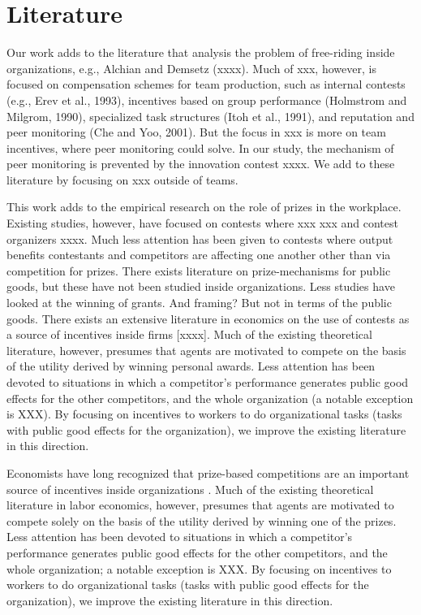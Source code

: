 \documentclass[11pt, titlepage]{article}
\begin{document}
\section{Literature}\label{literature}

Our work adds to the literature that analysis the problem of free-riding
inside organizations, e.g., Alchian and Demsetz (xxxx). Much of xxx,
however, is focused on compensation schemes for team production, such as
internal contests (e.g., Erev et al., 1993), incentives based on group
performance (Holmstrom and Milgrom, 1990), specialized task structures
(Itoh et al., 1991), and reputation and peer monitoring (Che and Yoo,
2001). But the focus in xxx is more on team incentives, where peer
monitoring could solve. In our study, the mechanism of peer monitoring
is prevented by the innovation contest xxxx. We add to these literature
by focusing on xxx outside of teams.

This work adds to the empirical research on the role of prizes in the
workplace. Existing studies, however, have focused on contests where xxx
xxx and contest organizers xxxx. Much less attention has been given to
contests where output benefits contestants and competitors are affecting
one another other than via competition for prizes. There exists
literature on prize-mechanisms for public goods, but these have not been
studied inside organizations. Less studies have looked at the winning of
grants. And framing? But not in terms of the public goods. There exists
an extensive literature in economics on the use of contests as a source
of incentives inside firms {[}xxxx{]}. Much of the existing theoretical
literature, however, presumes that agents are motivated to compete on
the basis of the utility derived by winning personal awards. Less
attention has been devoted to situations in which a competitor's
performance generates public good effects for the other competitors, and
the whole organization (a notable exception is XXX). By focusing on
incentives to workers to do organizational tasks (tasks with public good
effects for the organization), we improve the existing literature in
this direction.

Economists have long recognized that prize-based competitions are an
important source of incentives inside organizations
\citep{lazear1981rank, green1983comparison, nalebuff1983prizes, mary1984economic}.
Much of the existing theoretical literature in labor economics, however,
presumes that agents are motivated to compete solely on the basis of the
utility derived by winning one of the prizes. Less attention has been
devoted to situations in which a competitor's performance generates
public good effects for the other competitors, and the whole
organization; a notable exception is XXX. By focusing on incentives to
workers to do organizational tasks (tasks with public good effects for
the organization), we improve the existing literature in this direction.
\end{document}
